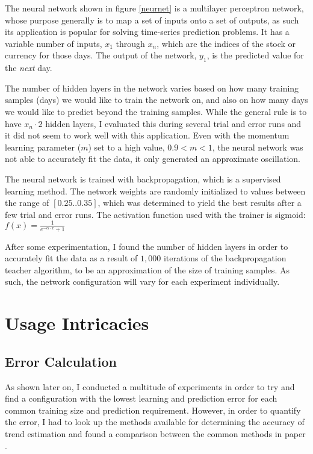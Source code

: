 \documentclass[a4paper,12pt]{article}
\begin{document}
	The neural network shown in figure \ref{neurnet} is a multilayer perceptron network, whose purpose generally is to map a set of inputs onto a set of outputs, as such its application is popular for solving time-series prediction problems. It has a variable number of inputs, $x_1$ through $x_n$, which are the indices of the stock or currency for those days. The output of the network, $y_1$, is the predicted value for the \textit{next} day.
	
	The number of hidden layers in the network varies based on how many training samples (days) we would like to train the network on, and also on how many days we would like to predict beyond the training samples. While the general rule is to have $x_n \cdot 2$ hidden layers, I evaluated this during several trial and error runs and it did not seem to work well with this application. Even with the momentum learning parameter ($m$) set to a high value, $0.9 < m < 1$, the neural network was not able to accurately fit the data, it only generated an approximate oscillation.
	
	The neural network is trained with backpropagation, which is a supervised learning method. The network weights are randomly initialized to values between the range of $[0.25..0.35]$, which was determined to yield the best results after a few trial and error runs. The activation function used with the trainer is sigmoid: $f(x) = \frac{1}{e^{-\alpha \cdot x} + 1}$
	
	After some experimentation, I found the number of hidden layers in order to accurately fit the data as a result of $1,000$ iterations of the backpropagation teacher algorithm, to be an approximation of the size of training samples. As such, the network configuration will vary for each experiment individually.

\section{Usage Intricacies}
\subsection{Error Calculation} \label{mape}

	As shown later on, I conducted a multitude of experiments in order to try and find a configuration with the lowest learning and prediction error for each common training size and prediction requirement. However, in order to quantify the error, I had to look up the methods available for determining the accuracy of trend estimation and found a comparison between the common methods in paper \cite{armstrong1992error}.
	
\end{document}
